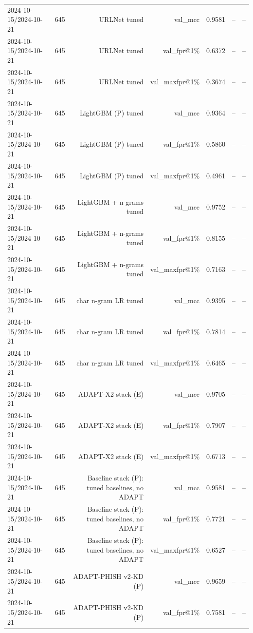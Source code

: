 \begin{table}[t]
\begin{tabular}{llrrrrr}
2024-10-15/2024-10-21 & 645 & URLNet tuned & val\_mcc & 0.9581 & -- & -- \\
2024-10-15/2024-10-21 & 645 & URLNet tuned & val\_fpr@1\% & 0.6372 & -- & -- \\
2024-10-15/2024-10-21 & 645 & URLNet tuned & val\_maxfpr@1\% & 0.3674 & -- & -- \\
2024-10-15/2024-10-21 & 645 & LightGBM (P) tuned & val\_mcc & 0.9364 & -- & -- \\
2024-10-15/2024-10-21 & 645 & LightGBM (P) tuned & val\_fpr@1\% & 0.5860 & -- & -- \\
2024-10-15/2024-10-21 & 645 & LightGBM (P) tuned & val\_maxfpr@1\% & 0.4961 & -- & -- \\
2024-10-15/2024-10-21 & 645 & LightGBM + n-grams tuned & val\_mcc & 0.9752 & -- & -- \\
2024-10-15/2024-10-21 & 645 & LightGBM + n-grams tuned & val\_fpr@1\% & 0.8155 & -- & -- \\
2024-10-15/2024-10-21 & 645 & LightGBM + n-grams tuned & val\_maxfpr@1\% & 0.7163 & -- & -- \\
2024-10-15/2024-10-21 & 645 & char n-gram LR tuned & val\_mcc & 0.9395 & -- & -- \\
2024-10-15/2024-10-21 & 645 & char n-gram LR tuned & val\_fpr@1\% & 0.7814 & -- & -- \\
2024-10-15/2024-10-21 & 645 & char n-gram LR tuned & val\_maxfpr@1\% & 0.6465 & -- & -- \\
2024-10-15/2024-10-21 & 645 & ADAPT-X2 stack (E) & val\_mcc & 0.9705 & -- & -- \\
2024-10-15/2024-10-21 & 645 & ADAPT-X2 stack (E) & val\_fpr@1\% & 0.7907 & -- & -- \\
2024-10-15/2024-10-21 & 645 & ADAPT-X2 stack (E) & val\_maxfpr@1\% & 0.6713 & -- & -- \\
2024-10-15/2024-10-21 & 645 & Baseline stack (P): tuned baselines, no ADAPT & val\_mcc & 0.9581 & -- & -- \\
2024-10-15/2024-10-21 & 645 & Baseline stack (P): tuned baselines, no ADAPT & val\_fpr@1\% & 0.7721 & -- & -- \\
2024-10-15/2024-10-21 & 645 & Baseline stack (P): tuned baselines, no ADAPT & val\_maxfpr@1\% & 0.6527 & -- & -- \\
2024-10-15/2024-10-21 & 645 & ADAPT-PHISH v2-KD (P) & val\_mcc & 0.9659 & -- & -- \\
2024-10-15/2024-10-21 & 645 & ADAPT-PHISH v2-KD (P) & val\_fpr@1\% & 0.7581 & -- & -- \\

\end{tabular}
\end{table}
